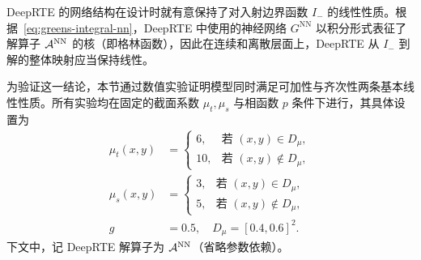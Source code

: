 DeepRTE 的网络结构在设计时就有意保持了对入射边界函数 $I_{-}$ 的线性性质。根据~\eqref{eq:greens-integral-nn}，DeepRTE 中使用的神经网络 $G^{\text{NN}}$ 以积分形式表征了解算子 $\mathcal{A}^{\text{NN}}$ 的核（即格林函数），因此在连续和离散层面上，DeepRTE 从 $I_{-}$ 到解的整体映射应当保持线性。

为验证这一结论，本节通过数值实验证明模型同时满足可加性与齐次性两条基本线性性质。所有实验均在固定的截面系数 $\mu_t,\mu_s$ 与相函数 $p$ 条件下进行，其具体设置为
\begin{equation}
    \begin{aligned}
        \mu_t(x,y) & =
        \begin{cases}
            6,  & \text{若 } (x,y) \in D_\mu,    \\
            10, & \text{若 } (x,y) \notin D_\mu,
        \end{cases}            \\
        \mu_s(x,y) & =
        \begin{cases}
            3, & \text{若 } (x,y) \in D_\mu,    \\
            5, & \text{若 } (x,y) \notin D_\mu,
        \end{cases}             \\
        g          & =0.5, \quad D_\mu = [0.4, 0.6]^2.
    \end{aligned}
\end{equation}
下文中，记 DeepRTE 解算子为 $\mathcal{A}^{\text{NN}}$（省略参数依赖）。

